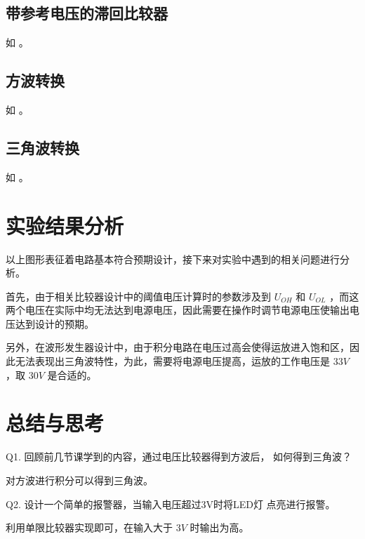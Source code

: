 \documentclass[lang=cn,11pt,a4paper,cite=authoryear]{elegantpaper}
\begin{document}
\subsection{带参考电压的滞回比较器}


如  。


\subsection{方波转换}

如  。


\subsection{三角波转换}

如  。


\section{实验结果分析}

以上图形表征着电路基本符合预期设计，接下来对实验中遇到的相关问题进行分析。

首先，由于相关比较器设计中的阈值电压计算时的参数涉及到 \(U_{OH}\) 和 \(U_{OL}\) ，而这两个电压在实际中均无法达到电源电压，因此需要在操作时调节电源电压使输出电压达到设计的预期。

另外，在波形发生器设计中，由于积分电路在电压过高会使得运放进入饱和区，因此无法表现出三角波特性，为此，需要将电源电压提高，运放的工作电压是 \(33 V\) ，取 \(30 V\) 是合适的。


\section{总结与思考}


Q1. 回顾前几节课学到的内容，通过电压比较器得到方波后，
如何得到三角波？

对方波进行积分可以得到三角波。

Q2. 设计一个简单的报警器，当输入电压超过3V时将LED灯
点亮进行报警。

利用单限比较器实现即可，在输入大于 \(3 V\) 时输出为高。

\end{document}
